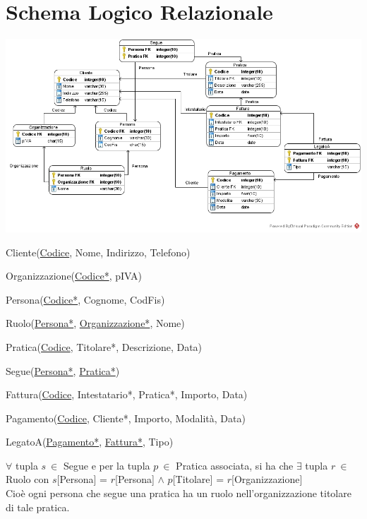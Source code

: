 \documentclass[10pt]{article}
\begin{document}
\section{Schema Logico Relazionale}
\begin{center}
	\includegraphics[scale=0.5]{LogicoRelazionale.jpg}
\end{center}
\begin{list}{}{\textbf{Notazione testuale}}
	\item Cliente(\underline{Codice}, Nome, Indirizzo, Telefono)
	\item Organizzazione(\underline{Codice*}, pIVA)
	\item Persona(\underline{Codice*}, Cognome, CodFis)
	\item Ruolo(\underline{Persona*}, \underline{Organizzazione*}, Nome)
	\item Pratica(\underline{Codice}, Titolare*, Descrizione, Data)
	\item Segue(\underline{Persona*}, \underline{Pratica*})
	\item Fattura(\underline{Codice}, Intestatario*, Pratica*, Importo, Data)
	\item Pagamento(\underline{Codice}, Cliente*, Importo, Modalità, Data)
	\item LegatoA(\underline{Pagamento*}, \underline{Fattura*}, Tipo)
\end{list}
\begin{list}{}{\textbf{Vincoli non catturati graficamente}}
	\item $\forall$ tupla $s\:\in$ Segue e per la tupla $p\:\in$ Pratica associata, si ha che $\exists$ tupla $r\:\in$ Ruolo con $s$[Persona] = $r$[Persona] $\wedge$ $p$[Titolare] = $r$[Organizzazione]\\
	Cioè ogni persona che segue una pratica ha un ruolo nell'organizzazione titolare di tale pratica.
\end{list}
\pagebreak
\end{document}
